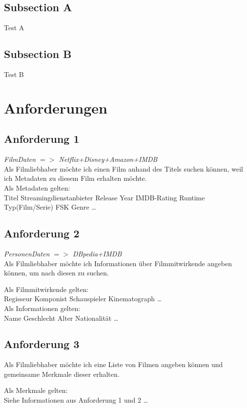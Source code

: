 \documentclass[conference]{IEEEtran}
\begin{document}
\subsection{Subsection A}

Test A

\subsection{Subsection B}

Test B

\section{Anforderungen}

\subsection{Anforderung 1}
\textit{FilmDaten $=>$ Netflix+Disney+Amazon+IMDB} 
\\
Als Filmliebhaber möchte ich einen Film anhand des Titels suchen können,
weil ich Metadaten zu diesem Film erhalten möchte.
\\
Als Metadaten gelten:
\\
Titel
Streamingdienstanbieter
Release Year
IMDB-Rating
Runtime
Typ(Film/Serie)
FSK
Genre
\dots


\subsection{Anforderung 2}
\textit{PersonenDaten $=>$ DBpedia+IMDB}
\\
Als Filmliebhaber möchte ich Informationen über Filmmitwirkende angeben können,
um nach diesen zu suchen.

Als Filmmitwirkende gelten:
\\
Regisseur
Komponist
Schauspieler
Kinematograph
\dots
\\
Als Informationen gelten:
\\
Name
Geschlecht
Alter
Nationalität
\dots
\\

\subsection{Anforderung 3}

Als Filmliebhaber möchte ich eine Liste von Filmen angeben können
und gemeinsame Merkmale dieser erhalten.

Als Merkmale gelten:
\\
Siehe Informationen aus Anforderung 1 und 2
\dots
\\
\end{document}
